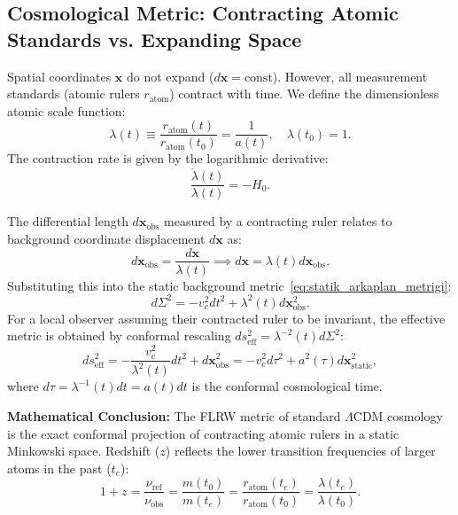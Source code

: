 \subsection{Cosmological Metric: Contracting Atomic Standards vs. Expanding Space}
Spatial coordinates $\mathbf{x}$ do not expand ($d\mathbf{x} = \text{const}$). However, all measurement standards (atomic rulers $r_{\mathrm{atom}}$) contract with time. We define the dimensionless atomic scale function:
\begin{equation}
    \lambda(t) \equiv \frac{r_{\mathrm{atom}}(t)}{r_{\mathrm{atom}}(t_0)} = \frac{1}{a(t)}, \quad \lambda(t_0) = 1.
    \label{eq:olcek_fonksiyonu}
\end{equation}
The contraction rate is given by the logarithmic derivative:
\begin{equation}
    \frac{\dot{\lambda}(t)}{\lambda(t)} = -H_0.
    \label{eq:buzulme_hubble}
\end{equation}

The differential length $d\mathbf{x}_{\mathrm{obs}}$ measured by a contracting ruler relates to background coordinate displacement $d\mathbf{x}$ as:
\begin{equation}
    d\mathbf{x}_{\mathrm{obs}} = \frac{d\mathbf{x}}{\lambda(t)} \implies d\mathbf{x} = \lambda(t) d\mathbf{x}_{\mathrm{obs}}.
    \label{eq:cetvel_donusumu}
\end{equation}
Substituting this into the static background metric~\eqref{eq:statik_arkaplan_metrigi}:
\begin{equation}
    d\Sigma^2 = -v_c^2 dt^2 + \lambda^2(t) d\mathbf{x}_{\mathrm{obs}}^2.
    \label{eq:buzulen_cetvel_metrigi}
\end{equation}
For a local observer assuming their contracted ruler to be invariant, the effective metric is obtained by conformal rescaling $ds_{\mathrm{eff}}^2 = \lambda^{-2}(t) d\Sigma^2$:
\begin{equation}
    ds_{\mathrm{eff}}^2 = -\frac{v_c^2}{\lambda^2(t)} dt^2 + d\mathbf{x}_{\mathrm{obs}}^2 = -v_c^2 d\tau^2 + a^2(\tau) d\mathbf{x}_{\mathrm{static}}^2,
    \label{eq:etkin_flrw}
\end{equation}
where $d\tau = \lambda^{-1}(t) dt = a(t) dt$ is the conformal cosmological time.

\textbf{Mathematical Conclusion:} The FLRW metric of standard $\Lambda$CDM cosmology is the exact conformal projection of contracting atomic rulers in a static Minkowski space. Redshift ($z$) reflects the lower transition frequencies of larger atoms in the past ($t_e$):
\begin{equation}
    1 + z = \frac{\nu_{\mathrm{ref}}}{\nu_{\mathrm{obs}}} = \frac{m(t_0)}{m(t_e)} = \frac{r_{\mathrm{atom}}(t_e)}{r_{\mathrm{atom}}(t_0)} = \frac{\lambda(t_e)}{\lambda(t_0)}.
    \label{eq:bizim_redshift}
\end{equation}


